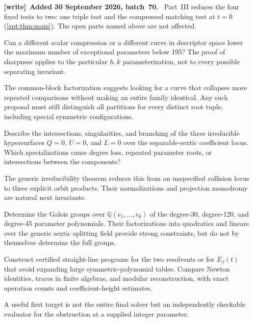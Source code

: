 \documentclass[11pt,letterpaper]{article}
\numberwithin{equation}{section}
\theoremstyle{definition}
\theoremstyle{remark}
\newcommand{\QQ}{\mathbb Q}
\newenvironment{writenote}[1][]{\par\smallskip\begingroup\small
 \noindent\textbf{[write]}\if\relax\detokenize{#1}\relax\else~\textbf{#1.}\fi\ }%
 {\par\endgroup\smallskip}
\begin{document}
\begin{writenote}[Added 30 September 2026, batch~70]
Part~III reduces the four fixed tests to two: one triple test and the
compressed matching test at $t=0$ (\cref{zpt:thm:main}). The open parts
named above are not affected.
\end{writenote}

\begin{question}
Can a different scalar compression or a different curve in descriptor
space lower the maximum number of exceptional parameters below 195?
The proof of sharpness applies to the particular $h,k$ parameterization,
not to every possible separating invariant.
\end{question}
The common-block factorization suggests looking for a curve that collapses
more repeated comparisons without making an entire family identical.
Any such proposal must still distinguish all partitions for every distinct
root tuple, including special symmetric configurations.

\begin{question}
Describe the intersections, singularities, and branching of the three
irreducible hypersurfaces $Q=0$, $U=0$, and $L=0$ over the separable-sextic
coefficient locus. Which specializations cause degree loss, repeated
parameter roots, or intersections between the components?
\end{question}
The generic irreducibility theorem reduces this from an unspecified
collision locus to three explicit orbit products. Their normalizations
and projection monodromy are natural next invariants.

\begin{question}
Determine the Galois groups over $\QQ(e_1,\ldots,e_6)$ of the degree-30,
degree-120, and degree-45 parameter polynomials. Their factorizations into
quadratics and linears over the generic sextic splitting field provide
strong constraints, but do not by themselves determine the full groups.
\end{question}

\begin{question}
\label{tpo:q:sbr-circuits}
Construct certified straight-line programs for the two resolvents or for
$E_f(t)$ that avoid expanding large symmetric-polynomial tables. Compare
Newton identities, traces in finite algebras, and modular reconstruction,
with exact operation counts and coefficient-height estimates.
\end{question}
A useful first target is not the entire final solver but an independently
checkable evaluator for the obstruction at a supplied integer parameter.
\end{document}
